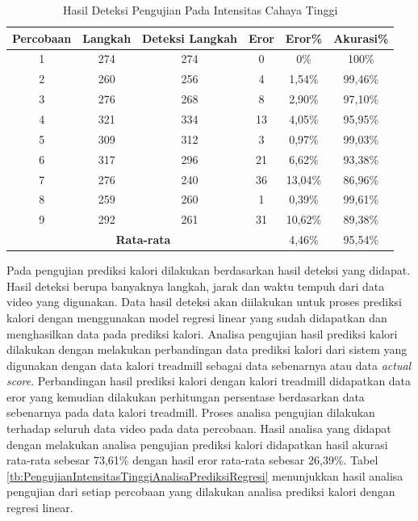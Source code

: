 \begin{longtable}{|c|c|c|c|c|c|}
  \caption{Hasil Deteksi Pengujian Pada Intensitas Cahaya Tinggi}
  \label{tb:PengujianIntensitasTinggiAnalisaDeteksi}                                   \\
  \hline
  \rowcolor[HTML]{C0C0C0}
  \textbf{Percobaan} & \textbf{Langkah} & \textbf{Deteksi Langkah} & \textbf{Eror} & \textbf{Eror\%} & \textbf{Akurasi\%} \\
  \hline
  1   & 274   & 274 & 0    & 0\%        & 100\%   \\
  \hline
  2   & 260   & 256 & 4    & 1,54\%     & 99,46\%   \\
  \hline
  3   & 276   & 268 & 8    & 2,90\%     & 97,10\%     \\
  \hline
  4   & 321   & 334 & 13   & 4,05\%     & 95,95\%   \\
  \hline
  5   & 309   & 312 & 3    & 0,97\%     & 99,03\%   \\
  \hline
  6   & 317   & 296 & 21   & 6,62\%     & 93,38\%   \\
  \hline
  7   & 276   & 240 & 36   & 13,04\%    & 86,96\%   \\
  \hline
  8   & 259   & 260 & 1    & 0,39\%     & 99,61\%   \\
  \hline
  9   & 292   & 261 & 31   & 10,62\%    & 89,38\%   \\
  \hline
  

  \multicolumn{4}{|c|}{\textbf{Rata-rata}} & 4,46\% & 95,54\% \\
  \hline
\end{longtable}

Pada pengujian prediksi kalori dilakukan berdasarkan hasil deteksi yang didapat. Hasil deteksi berupa banyaknya langkah, jarak dan waktu tempuh dari data video yang digunakan. Data hasil deteksi akan diilakukan untuk proses prediksi kalori dengan menggunakan model regresi linear yang sudah didapatkan dan menghasilkan data pada prediksi kalori. Analisa pengujian hasil prediksi kalori dilakukan dengan melakukan perbandingan data prediksi kalori dari sistem yang digunakan dengan data kalori treadmill sebagai data sebenarnya atau data \emph{actual score}. Perbandingan hasil prediksi kalori dengan kalori treadmill didapatkan data eror yang kemudian dilakukan perhitungan persentase berdasarkan data sebenarnya pada data kalori treadmill. Proses analisa pengujian dilakukan terhadap seluruh data video pada data percobaan. Hasil analisa yang didapat dengan melakukan analisa pengujian prediksi kalori didapatkan hasil akurasi rata-rata sebesar 73,61\% dengan hasil eror rata-rata sebesar 26,39\%. Tabel \ref{tb:PengujianIntensitasTinggiAnalisaPrediksiRegresi} menunjukkan hasil analisa pengujian dari setiap percobaan yang dilakukan analisa prediksi kalori dengan regresi linear.

